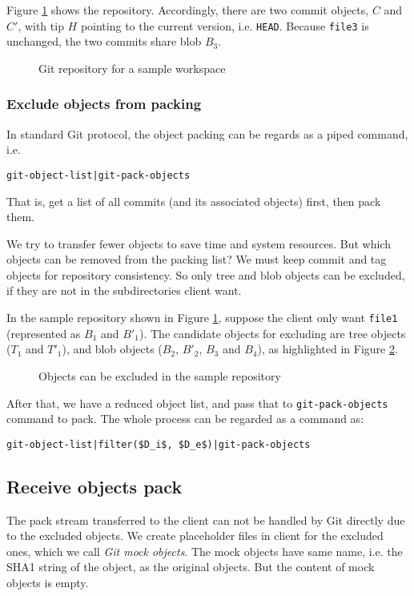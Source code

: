 \documentclass[preprint]{sigplanconf}
\begin{document}
Figure \ref{fig:git-repo} shows the repository.
Accordingly, there are two commit objects, $C$ and $C'$, with tip $H$ pointing to the current version, i.e. \verb|HEAD|.
Because \verb|file3| is unchanged, the two commits share blob $B_3$.

\begin{figure}[htpb]
  \centering
  
  \caption{Git repository for a sample workspace}
  \label{fig:git-repo}
\end{figure}

\subsubsection{Exclude objects from packing}
In standard Git protocol, the object packing can be regards as a piped command, i.e.
\begin{verbatim}
git-object-list|git-pack-objects
\end{verbatim}
That is, get a list of all commits (and its associated objects) first, then pack them.

We try to transfer fewer objects to save time and system resources.
But which objects can be removed from the packing list?
We must keep commit and tag objects for repository consistency.
So only tree and blob objects can be excluded, if they are not in the subdirectories client want.

In the sample repository shown in Figure \ref{fig:git-repo}, suppose the client only want \verb|file1| (represented as $B_1$ and $B'_1$).
The candidate objects for excluding are tree objects ($T_1$ and $T'_1$), and blob objects ($B_2$, $B'_2$, $B_3$ and $B_4$), as highlighted in Figure \ref{fig:find-obj-to-remove}.
\begin{figure}[htpb]
  \centering
  
  \caption{Objects can be excluded in the sample repository}
  \label{fig:find-obj-to-remove}
\end{figure}

After that, we have a reduced object list, and pass that to \verb|git-pack-objects| command to pack.
The whole process can be regarded as a command as:
\begin{verbatim}
git-object-list|filter($D_i$, $D_e$)|git-pack-objects
\end{verbatim}

\subsection{Receive objects pack}
The pack stream transferred to the client can not be handled by Git directly due to the excluded objects.
We create placeholder files in client for the excluded ones, which we call \emph{Git mock objects}.
The mock objects have same name, i.e. the SHA1 string of the object, as the original objects.
But the content of mock objects is empty.
\end{document}
